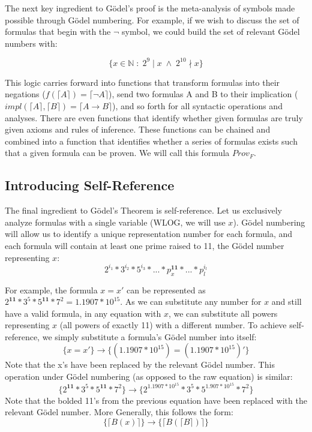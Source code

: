 \documentclass[conference]{IEEEtran}
\begin{document}
The next key ingredient to Gödel's proof is the meta-analysis of symbols made possible through Gödel numbering. For example, if we wish to discuss the set of formulas that begin with the $\neg$ symbol, we could build the set of relevant Gödel numbers with:

\[\{x \in \mathbb{N} \; : \;2^9\mid x \; \land \; 2^{10} \nmid x\}\]

This logic carries forward into functions that transform formulas into their negations ($f(
\lceil A \rceil ) = \lceil \neg A \rceil$), send two formulas A and B to their implication ($impl(\lceil A \rceil , \lceil B \rceil ) = \lceil A \rightarrow B \rceil$), and so forth for all syntactic operations and analyses. There are even functions that identify whether given formulas are truly given axioms and rules of inference. These functions can be chained and combined into a function that identifies whether a series of formulas exists such that a given formula can be proven. We will call this formula $Prov_F$.

\subsection{Introducing Self-Reference}
The final ingredient to Gödel's Theorem is self-reference. Let us exclusively analyze formulas with a single variable (WLOG, we will use $x$). Gödel numbering will allow us to identify a unique representation number for each formula, and each formula will contain at least one prime raised to 11, the Gödel number representing $x$:
\[2^{i_1}*3^{i_2}*5^{i_3}*...*p_x^{\textbf{11}}*...*p_l^{i_l}\]

For example, the formula $x=x'$ can be represented as $2^{\textbf{11}}*3^5*5^{\textbf{11}}*7^2 = 1.1907*10^{15}$. As we can substitute any number for $x$ and still have a valid formula, in any equation with $x$, we can substitute all powers representing $x$ (all powers of exactly 11) with a different number. To achieve self-reference, we simply substitute a formula's Gödel number into itself:
\[\{x=x'\} \rightarrow \{(1.1907*10^{15}) = (1.1907*10^{15})'\}\]
Note that the x's have been replaced by the relevant Gödel number. This operation under Gödel numbering (as opposed to the raw equation) is similar:
\[\{2^{\textbf{11}}*3^5*5^{\textbf{11}}*7^2\} \rightarrow \{2^{1.1907*10^{15}}*3^5*5^{1.907*10^{15}}*7^2\}\]
Note that the bolded 11's from the previous equation have been replaced with the relevant Gödel number. More Generally, this follows the form:
\[\{\lceil B(x)\rceil\} \rightarrow \{\lceil B(\lceil B\rceil )\rceil\}\]
\end{document}
